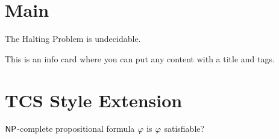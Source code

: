 \documentclass[11pt]{article}
\title{\assignmenttitle}
\author{\myname\,(\myandrew)}
\date{\today} %
\begin{document}
\maketitle

\section{Main}
\begin{theorem}[Halting]
    The Halting Problem is undecidable.
\end{theorem}

{This is an info card where you can put any content with a title and tags.}

\section{TCS Style Extension}
{$\mathsf{NP}$-complete}
{propositional formula $\varphi$}
{is $\varphi$ satisfiable?}

% 
% 

\label{mylastpagelabel}
\end{document}
